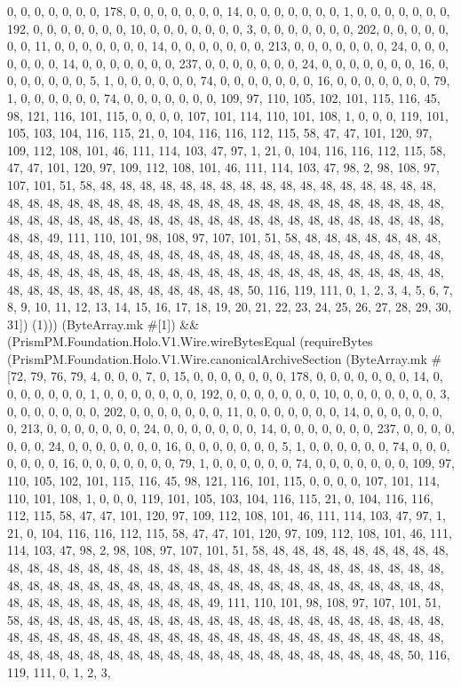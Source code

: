 \documentclass[11pt]{article}
\begin{document}
0, 0, 0, 0, 0, 0, 0, 178, 0, 0, 0, 0, 0, 0, 0, 14, 0, 0, 0, 0, 0, 0, 0, 1, 0, 0, 0, 0, 0, 0, 0, 192, 0, 0, 0, 0, 0, 0, 0, 10, 0, 0, 0, 0, 0, 0, 0, 3, 0, 0, 0, 0, 0, 0, 0, 202, 0, 0, 0, 0, 0, 0, 0, 11, 0, 0, 0, 0, 0, 0, 0, 14, 0, 0, 0, 0, 0, 0, 0, 213, 0, 0, 0, 0, 0, 0, 0, 24, 0, 0, 0, 0, 0, 0, 0, 14, 0, 0, 0, 0, 0, 0, 0, 237, 0, 0, 0, 0, 0, 0, 0, 24, 0, 0, 0, 0, 0, 0, 0, 16, 0, 0, 0, 0, 0, 0, 0, 5, 1, 0, 0, 0, 0, 0, 0, 74, 0, 0, 0, 0, 0, 0, 0, 16, 0, 0, 0, 0, 0, 0, 0, 79, 1, 0, 0, 0, 0, 0, 0, 74, 0, 0, 0, 0, 0, 0, 0, 109, 97, 110, 105, 102, 101, 115, 116, 45, 98, 121, 116, 101, 115, 0, 0, 0, 0, 107, 101, 114, 110, 101, 108, 1, 0, 0, 0, 119, 101, 105, 103, 104, 116, 115, 21, 0, 104, 116, 116, 112, 115, 58, 47, 47, 101, 120, 97, 109, 112, 108, 101, 46, 111, 114, 103, 47, 97, 1, 21, 0, 104, 116, 116, 112, 115, 58, 47, 47, 101, 120, 97, 109, 112, 108, 101, 46, 111, 114, 103, 47, 98, 2, 98, 108, 97, 107, 101, 51, 58, 48, 48, 48, 48, 48, 48, 48, 48, 48, 48, 48, 48, 48, 48, 48, 48, 48, 48, 48, 48, 48, 48, 48, 48, 48, 48, 48, 48, 48, 48, 48, 48, 48, 48, 48, 48, 48, 48, 48, 48, 48, 48, 48, 48, 48, 48, 48, 48, 48, 48, 48, 48, 48, 48, 48, 48, 48, 48, 48, 48, 48, 48, 48, 49, 111, 110, 101, 98, 108, 97, 107, 101, 51, 58, 48, 48, 48, 48, 48, 48, 48, 48, 48, 48, 48, 48, 48, 48, 48, 48, 48, 48, 48, 48, 48, 48, 48, 48, 48, 48, 48, 48, 48, 48, 48, 48, 48, 48, 48, 48, 48, 48, 48, 48, 48, 48, 48, 48, 48, 48, 48, 48, 48, 48, 48, 48, 48, 48, 48, 48, 48, 48, 48, 48, 48, 48, 48, 50, 116, 119, 111, 0, 1, 2, 3, 4, 5, 6, 7, 8, 9, 10, 11, 12, 13, 14, 15, 16, 17, 18, 19, 20, 21, 22, 23, 24, 25, 26, 27, 28, 29, 30, 31]) (1))) (ByteArray.mk \#[1]) \&\& (PrismPM.Foundation.Holo.V1.Wire.wireBytesEqual (requireBytes (PrismPM.Foundation.Holo.V1.Wire.canonicalArchiveSection (ByteArray.mk \#[72, 79, 76, 79, 4, 0, 0, 0, 7, 0, 15, 0, 0, 0, 0, 0, 0, 0, 178, 0, 0, 0, 0, 0, 0, 0, 14, 0, 0, 0, 0, 0, 0, 0, 1, 0, 0, 0, 0, 0, 0, 0, 192, 0, 0, 0, 0, 0, 0, 0, 10, 0, 0, 0, 0, 0, 0, 0, 3, 0, 0, 0, 0, 0, 0, 0, 202, 0, 0, 0, 0, 0, 0, 0, 11, 0, 0, 0, 0, 0, 0, 0, 14, 0, 0, 0, 0, 0, 0, 0, 213, 0, 0, 0, 0, 0, 0, 0, 24, 0, 0, 0, 0, 0, 0, 0, 14, 0, 0, 0, 0, 0, 0, 0, 237, 0, 0, 0, 0, 0, 0, 0, 24, 0, 0, 0, 0, 0, 0, 0, 16, 0, 0, 0, 0, 0, 0, 0, 5, 1, 0, 0, 0, 0, 0, 0, 74, 0, 0, 0, 0, 0, 0, 0, 16, 0, 0, 0, 0, 0, 0, 0, 79, 1, 0, 0, 0, 0, 0, 0, 74, 0, 0, 0, 0, 0, 0, 0, 109, 97, 110, 105, 102, 101, 115, 116, 45, 98, 121, 116, 101, 115, 0, 0, 0, 0, 107, 101, 114, 110, 101, 108, 1, 0, 0, 0, 119, 101, 105, 103, 104, 116, 115, 21, 0, 104, 116, 116, 112, 115, 58, 47, 47, 101, 120, 97, 109, 112, 108, 101, 46, 111, 114, 103, 47, 97, 1, 21, 0, 104, 116, 116, 112, 115, 58, 47, 47, 101, 120, 97, 109, 112, 108, 101, 46, 111, 114, 103, 47, 98, 2, 98, 108, 97, 107, 101, 51, 58, 48, 48, 48, 48, 48, 48, 48, 48, 48, 48, 48, 48, 48, 48, 48, 48, 48, 48, 48, 48, 48, 48, 48, 48, 48, 48, 48, 48, 48, 48, 48, 48, 48, 48, 48, 48, 48, 48, 48, 48, 48, 48, 48, 48, 48, 48, 48, 48, 48, 48, 48, 48, 48, 48, 48, 48, 48, 48, 48, 48, 48, 48, 48, 49, 111, 110, 101, 98, 108, 97, 107, 101, 51, 58, 48, 48, 48, 48, 48, 48, 48, 48, 48, 48, 48, 48, 48, 48, 48, 48, 48, 48, 48, 48, 48, 48, 48, 48, 48, 48, 48, 48, 48, 48, 48, 48, 48, 48, 48, 48, 48, 48, 48, 48, 48, 48, 48, 48, 48, 48, 48, 48, 48, 48, 48, 48, 48, 48, 48, 48, 48, 48, 48, 48, 48, 48, 48, 50, 116, 119, 111, 0, 1, 2, 3, 
\end{document}
